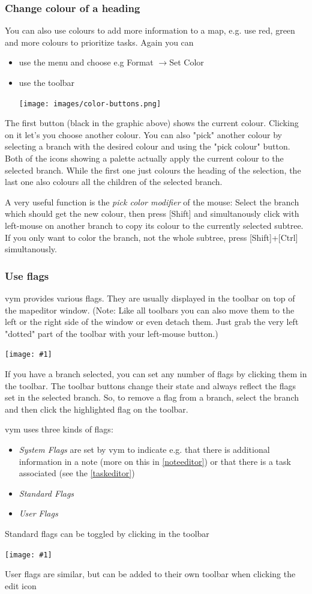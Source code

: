 \documentclass[12pt,a4paper]{article}
\newcommand{\maximage}[1]{  
    \begin{center}
        \texttt{[image: \#1]} 
    \end{center}
}
\newcommand{\vym}{{\sc vym }}
\newcommand{\ra}{$\longrightarrow$}
\newcommand{\key}[1]{[#1]}
\begin{document}
\subsubsection*{Change colour of a heading}
You can also use colours to add more information to a map, e.g. use
red, green and more colours to prioritize tasks. Again you can
\begin{itemize}
    \item use the menu and choose e.g Format \ra Set Color
    \item use the toolbar
        \begin{center}
            \texttt{[image: images/color-buttons.png]}
        \end{center}    
\end{itemize}
The first button (black in the graphic above) shows the current colour.
Clicking on it let's you choose another colour. You can also "pick"
another colour by selecting a branch with the desired colour and using
the "pick colour" button. Both of the icons showing a palette actually
apply the current colour to the selected branch. While the first one
just colours the heading of the selection, the last one also colours all
the children of the selected branch.

A very useful function is the {\em pick color modifier} of the mouse:
Select the branch which should get the new colour, then press
\key{Shift} and simultanously click with left-mouse on another branch to
copy its colour to the currently selected subtree. If you only want to
color the branch, not the whole subtree, press \key{Shift}+\key{Ctrl}
simultanously. 

\subsubsection*{Use flags}
\vym provides various flags. They are usually displayed in the toolbar
on top of the mapeditor window. (Note: Like all toolbars you can also
move them to the left or the right side of the window or even detach
them. Just grab the very left "dotted" part of the toolbar with your
left-mouse button.) 
\maximage{images/default-flags.png} 
If you have a branch selected, you can set any number of flags by
clicking them in the toolbar. The toolbar buttons change their state and
always reflect the flags set in the selected branch. So, to remove a
flag from a branch, select the branch and then click the highlighted
flag on the toolbar.

\vym uses three kinds of flags: 
\begin{itemize}
    \item {\em System Flags}
        are set by \vym to indicate e.g. that there is additional
        information in a note (more on this in \ref{noteeditor}) or 
        that there is a task associated (see the \ref{taskeditor})
    \item {\em Standard Flags}
    \item {\em User Flags} 
\end{itemize}
Standard flags can be toggled by clicking in the toolbar
    \maximage{images/default-flags.png}
User flags are similar, but can be added to their own toolbar when clicking the edit icon
\end{document}
